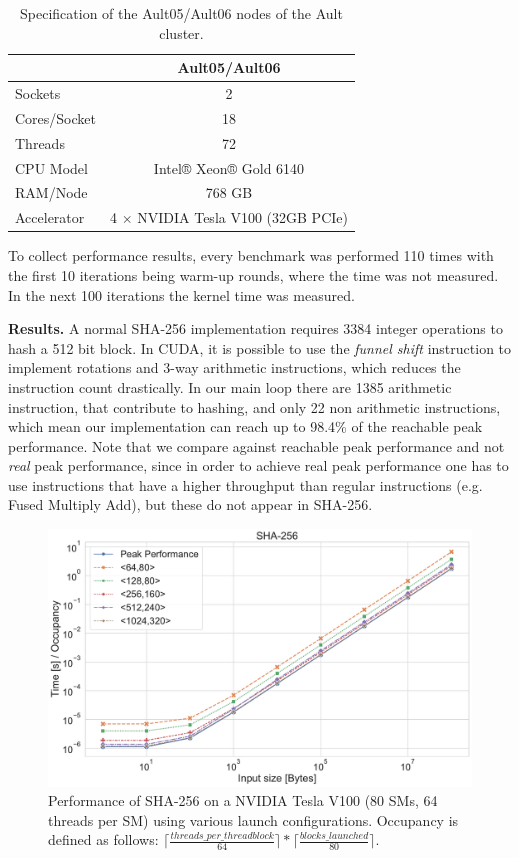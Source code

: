 \documentclass[letterpaper]{article}
\newcommand{\mypar}[1]{{\bf #1.}}
\begin{document}
\begin{table}[h]
\centering
\caption{Specification of the Ault05/Ault06 nodes of the Ault cluster.\label{table:Ault}}
\begin{tabularx}{\linewidth}{ l c }
\toprule
& Ault05/Ault06  \\
\midrule
Sockets & 2  \\
Cores/Socket & 18\\
Threads & 72 \\
CPU Model & Intel® Xeon® Gold 6140  \\
RAM/Node & 768 GB \\
Accelerator & 4 $\times$ NVIDIA Tesla V100 (32GB PCIe) \\
\bottomrule
\end{tabularx}
\end{table}

To collect performance results, every benchmark was performed 110 times with the first 10 iterations being warm-up rounds, where the time was not measured. In the next 100 iterations the kernel time was measured.

\mypar{Results}
A normal SHA-256 implementation requires 3384 integer operations to hash a 512 bit block.
In CUDA, it is possible to use the \emph{funnel shift} instruction to implement rotations and 3-way arithmetic instructions, which reduces the instruction count drastically. In our main loop there are 1385 arithmetic instruction, that contribute to hashing, and only 22 non arithmetic instructions, which mean our implementation can reach up to 98.4\% of the reachable peak performance. Note that we compare against reachable peak performance and not \emph{real} peak performance, since in order to achieve real peak performance one has to use instructions that have a higher throughput than regular instructions (e.g. Fused Multiply Add), but these do not appear in SHA-256.

\begin{figure}[h]\centering
\includegraphics[scale=0.23]{plot_sha.pdf}
  \caption{Performance of SHA-256 on a NVIDIA Tesla V100 (80 SMs, 64 threads per SM) using various launch configurations. Occupancy is defined as follows: $\lceil \frac{threads\_per\_threadblock}{ 64} \rceil * \lceil \frac{blocks\_launched}{  80} \rceil$.   \label{fig:sha256}}
\end{figure}
 
\end{document}
